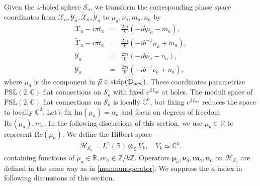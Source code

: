 \documentclass[aps,prd,notitlepage,nofootinbib,superscriptaddress,groupedaddress,twocolumn]{revtex4-1}
\def\C{\mathbb{C}}
\def\R{\mathbb{R}}
\newcommand{\PSlc}{\mathrm{PSL}(2,\mathbb{C})}
\def\be{\begin{eqnarray}}
\def\ee{\end{eqnarray}}
\newcommand{\ch}{\mathcal H}
\newcommand{\cs}{\mathcal S}
\newcommand{\cx}{\mathcal X}
\newcommand{\cy}{\mathcal Y}
\begin{document}
Given the 4-holed sphere $\cs_a$, we transform the corresponding phase space coordinates from $\cx_a,\cy_a,\widetilde{\cx}_a,\widetilde{\cy}_a$ to $\mu_a,\nu_a,m_a,n_a$ by
\be
\cx_a-i\pi t_a&=&\frac{2\pi i}{k}(-i b\mu_{a}-m_{a}),\label{cxa}\\
\widetilde{\cx}_a-i\pi t_a&=&\frac{2\pi i}{k}(-i b^{-1}\mu_{a}+m_{a}),\\
\cy_a&=&\frac{2 \pi i}{k}(-i b \nu_{a}-n_{a}), \\
\widetilde{\cy}_a&=&\frac{2 \pi i}{k}\left(-i b^{-1} \nu_{a}+n_{a}\right),\label{cya}
\ee
where $\mu_{a}$ is the component in $\vec{\mu}\in\mathrm{strip}(\mathfrak{P}_{\rm new})$. These coordinates parametrize $\PSlc$ flat connections on $\cs_a$ with fixed $e^{2L_{ab}}$ at holes. The moduli space of $\PSlc$ flat connections on $\cs_a$ is locally $\C^6$, but fixing $e^{2L_{ab}}$ reduces the space to locally $\C^2$. Let's fix $\mathrm{Im}(\mu_{a})=\alpha_{a}$ and focus on degrees of freedom $\mathrm{Re}(\mu_{a}),m_{a}$. In the following discussions of this section, we use $\mu_a\in\R$ to represent $\mathrm{Re}(\mu_a)$. We define the Hilbert space
\be
\ch_{\cs_a}=L^2(\R)\otimes_\C V_k,\quad V_k\simeq \C^k.
\ee
containing functions of $\mu_{a}\in\R,m_{a}\in \mathbb{Z}/k\mathbb{Z}$. 
Operators $\bm{\mu}_a,\bm{\nu}_a,\mathbf{m}_a,\mathbf{n}_a$ on $\ch_{\cs_a}$ are defined in the same way as in \eqref{mumnunoperator}. We suppress the $a$ index in following discussions of this section.
\end{document}
